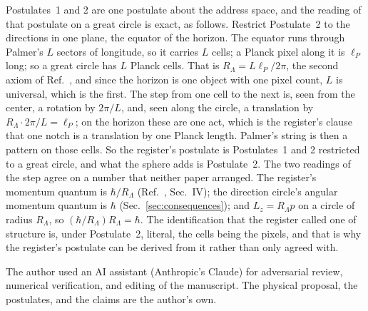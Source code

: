 \documentclass[aps,prd,twocolumn,superscriptaddress,nofootinbib]{revtex4-2}
\begin{document}
Postulates~1 and 2 are one postulate about the address space, and the reading of that postulate on a great circle is exact, as follows. Restrict Postulate~2 to the directions in one plane, the equator of the horizon. The equator runs through Palmer's $L$ sectors of longitude, so it carries $L$ cells; a Planck pixel along it is $\ell_P$ long; so a great circle has $L$ Planck cells. That is $R_\Lambda = L\ell_P/2\pi$, the second axiom of Ref.~\cite{korytko2026}, and since the horizon is one object with one pixel count, $L$ is universal, which is the first. The step from one cell to the next is, seen from the center, a rotation by $2\pi/L$, and, seen along the circle, a translation by $R_\Lambda\cdot2\pi/L = \ell_P$; on the horizon these are one act, which is the register's clause that one notch is a translation by one Planck length. Palmer's string is then a pattern on those cells. So the register's postulate is Postulates~1 and 2 restricted to a great circle, and what the sphere adds is Postulate~2. The two readings of the step agree on a number that neither paper arranged. The register's momentum quantum is $\hbar/R_\Lambda$ (Ref.~\cite{korytko2026c}, Sec.~IV); the direction circle's angular momentum quantum is $\hbar$ (Sec.~\ref{sec:consequences}); and $L_z = R_\Lambda p$ on a circle of radius $R_\Lambda$, so $(\hbar/R_\Lambda)R_\Lambda = \hbar$. The identification that the register called one of structure is, under Postulate~2, literal, the cells being the pixels, and that is why the register's postulate can be derived from it rather than only agreed with.

\begin{acknowledgments}
The author used an AI assistant (Anthropic's Claude) for adversarial review, numerical verification, and editing of the manuscript. The physical proposal, the postulates, and the claims are the author's own.
\end{acknowledgments}
\end{document}
